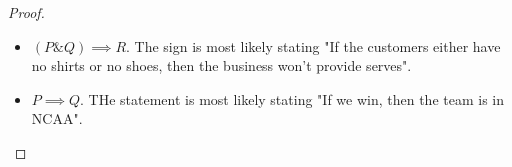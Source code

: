 \documentclass{article}
\begin{document}
\begin{proof}

    \hfill

    \begin{itemize}
        \item[a)] $(P\& Q)\implies R$. The sign is most likely stating "If the customers either have no shirts or no shoes, then the business won't provide serves".
        \item[b)] $P\implies Q$. THe statement is most likely stating "If we win, then the team is in NCAA". 
    \end{itemize}
\end{proof}
\end{document}
